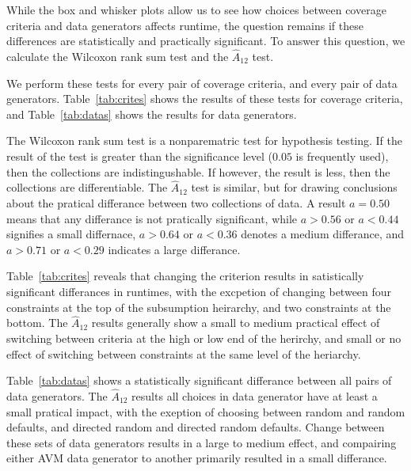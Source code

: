 
While the box and whisker plots allow us to see how choices between coverage criteria and data generators affects
runtime, the question remains if these differences are statistically and practically significant. To answer this
question, we calculate the Wilcoxon rank sum test and the $\hat{A}_{12}$ test.

We perform these tests for every pair of coverage criteria, and every pair of data generators.  Table~\ref{tab:crites}
shows the results of these tests for coverage criteria, and Table~\ref{tab:datas} shows the results for data generators.

The Wilcoxon rank sum test is a nonparematric test for hypothesis testing.  If the result of the test is greater than
the significance level ($0.05$ is frequently used), then the collections are indistingushable.  If however, the result
is less, then the collections are differentiable.  The $\hat{A}_{12}$ test is similar, but for drawing conclusions about
the pratical differance between two collections of data.  A result $a=0.5$0 means that any differance is not pratically
significant, while $a>0.56$ or $a<0.44$ signifies a small differnace, $a>0.64$ or $a<0.36$ denotes a medium differance,
and $a>0.71$ or $a<0.29$ indicates a large differance.

Table~\ref{tab:crites} reveals that changing the criterion results in satistically significant differances in runtimes,
with the excpetion of changing between four constraints at the top of the subsumption heirarchy, and two constraints at
the bottom.  The $\hat{A}_{12}$ results generally show a small to medium practical effect of switching between
criteria at the high or low end of the herirchy, and small or no effect of switching between constraints at the same
level of the heriarchy.


Table~\ref{tab:datas} shows a statistically significant differance between all pairs of data generators. The
$\hat{A}_{12}$ results all choices in data generator have at least a small pratical impact, with the exeption of
choosing between random and random defaults, and directed random and directed random defaults.  Change between these
sets of data generators results in a large to medium effect, and compairing either AVM data generator to another
primarily resulted in a small differance.

